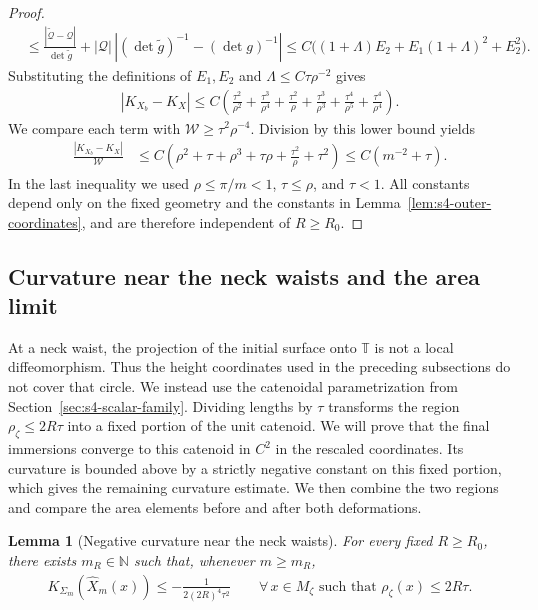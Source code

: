 \documentclass[a4paper,11pt,oneside,reqno]{amsart}
\numberwithin{equation}{section}
\newtheorem{lemma}[theorem]{Lemma}
\theoremstyle{definition}
\begin{document}
\begin{proof}
\begin{align*}
        &\leq
        \frac{|\widetilde{\mathcal Q}-\mathcal Q|}
             {\det\widetilde g}
        +|\mathcal Q|\,
             |(\det\widetilde g)^{-1}-(\det g)^{-1}|\leq C\bigl((1+\Lambda)E_2
                 +E_1(1+\Lambda)^2+E_2^2\bigr).
    \end{align*}
    Substituting the definitions of $E_1,E_2$ and
    $\Lambda\leq C\tau\rho^{-2}$ gives
    \begin{align*}
        |K_{X_b}-K_X|
        \leq C\left(
        \frac{\tau^2}{\rho^2}+\frac{\tau^3}{\rho^4}
        +\frac{\tau^2}{\rho}+\frac{\tau^3}{\rho^3}
        +\frac{\tau^4}{\rho^5}+\frac{\tau^4}{\rho^4}
        \right).
    \end{align*}
    We compare each term with
    $\mathcal W\geq\tau^2\rho^{-4}$. Division by this
    lower bound yields
    \begin{align*}
        \frac{|K_{X_b}-K_X|}{\mathcal W}
        &\leq C\left(
             \rho^2+\tau+\rho^3+\tau\rho
             +\frac{\tau^2}{\rho}+\tau^2\right)\leq C(m^{-2}+\tau).
    \end{align*}
    In the last inequality we used
    $\rho\leq\pi/m<1$, $\tau\leq\rho$, and $\tau<1$.
    All constants depend only on the fixed geometry and
    the constants in Lemma~\ref{lem:s4-outer-coordinates},
    and are therefore independent of $R\geq R_0$.
\end{proof}

\subsection{Curvature near the neck waists and the area limit}

At a neck waist, the projection of the initial surface onto
$\mathbb T$ is not a local diffeomorphism. Thus the height
coordinates used in the preceding subsections do not cover
that circle. We instead use the catenoidal parametrization
from Section~\ref{sec:s4-scalar-family}. Dividing lengths by
$\tau$ transforms the region $\rho_\zeta\leq2R\tau$ into a
fixed portion of the unit catenoid. We will prove that the
final immersions converge to this catenoid in $C^2$ in the
rescaled coordinates. Its curvature is bounded above by a
strictly negative constant on this fixed portion, which gives
the remaining curvature estimate. We then combine the two
regions and compare the area elements before and after both
deformations.

\begin{lemma}[Negative curvature near the neck waists]
    \label{lem:s4-core-negative-curvature}
    For every fixed $R\geq R_0$, there exists $m_R\in\mathbb N$
    such that, whenever $m\geq m_R$,
    \begin{align}
        \label{eq:s4-core-negative-curvature}
        K_{\Sigma_m}(\widehat X_m(x))
        \leq-\frac{1}{2(2R)^4\tau^2}
        \qquad\forall\,x\in M_\zeta
        \mbox{ such that }\rho_\zeta(x)\leq2R\tau.
    \end{align}
\end{lemma}
\end{document}
